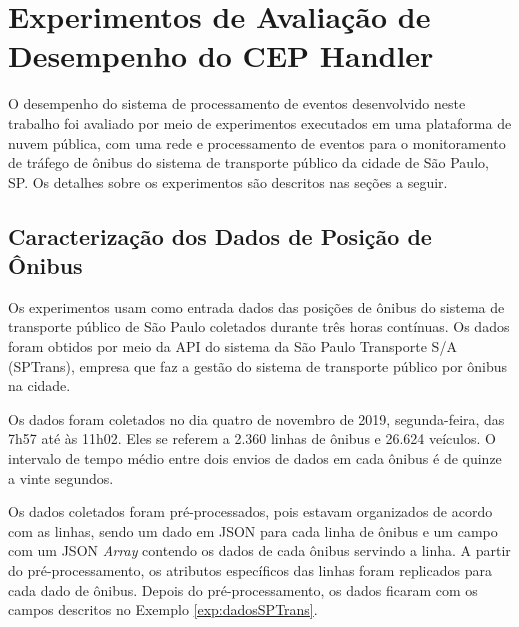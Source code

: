 \chapter{Experimentos de Avaliação de Desempenho do CEP Handler}
\label{cap:experimento}

O desempenho do sistema de processamento de eventos desenvolvido neste trabalho foi avaliado por meio de experimentos executados em uma plataforma de nuvem pública, com uma rede e processamento de eventos para o monitoramento de tráfego de ônibus do sistema de transporte público da cidade de São Paulo, SP. Os detalhes sobre os experimentos são descritos nas seções a seguir.

\section{Caracterização dos Dados de Posição de Ônibus}

Os experimentos usam como entrada dados das posições de ônibus do sistema de transporte público de São Paulo coletados durante três horas contínuas. Os dados foram obtidos por meio da API do sistema \cite{Olhovivo} da São Paulo Transporte S/A (SPTrans), empresa que faz a gestão do sistema de transporte público por ônibus na cidade.

Os dados foram coletados no dia quatro de novembro de 2019, segunda-feira, das 7h57 até às 11h02. Eles se referem a 2.360 linhas de ônibus e 26.624 veículos. O intervalo de tempo médio entre dois envios de dados em cada ônibus é de quinze a vinte segundos.

Os dados coletados foram pré-processados, pois estavam organizados de acordo com as linhas, sendo um dado em JSON para cada linha de ônibus e um campo com um JSON \textit{Array} contendo os dados de cada ônibus servindo a linha. A partir do pré-processamento, os atributos específicos das linhas foram replicados para cada dado de ônibus.
Depois do pré-processamento, os dados ficaram com os campos descritos no Exemplo \ref{exp:dadosSPTrans}.

